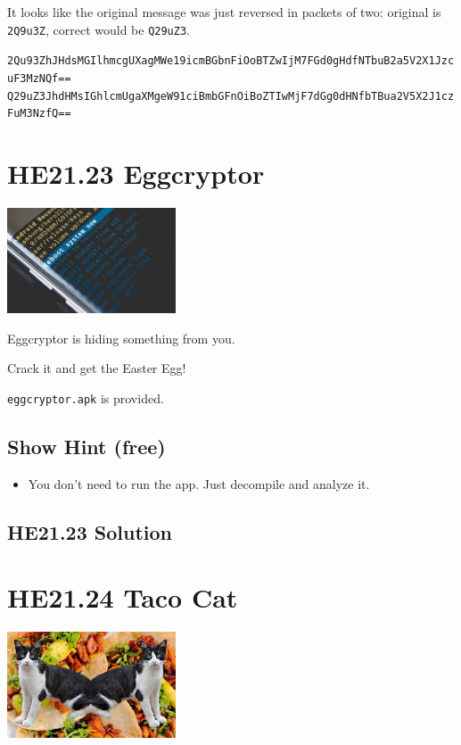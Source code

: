 \documentclass[english,a4paper,nols,noindent]{tufte-handout}
\begin{document}
It looks like the original message was just reversed in packets of two: original is \verb+2Q9u3Z+, correct would be \verb+Q29uZ3+.

\verb+2Qu93ZhJHdsMGIlhmcgUXagMWe19icmBGbnFiOoBTZwIjM7FGd0gHdfNTbuB2a5V2X1JzcuF3MzNQf==+
\verb+Q29uZ3JhdHMsIGhlcmUgaXMgeW91ciBmbGFnOiBoZTIwMjF7dGg0dHNfbTBua2V5X2J1czFuM3NzfQ==+

\hypertarget{he21.23}{%
  \section{HE21.23 Eggcryptor}
  \label{he21.23}}
\begin{marginfigure}
    \includegraphics[width=50mm]{images/challenge23.jpg}
\end{marginfigure}

\noindent Eggcryptor is hiding something from you.

Crack it and get the Easter Egg!

\verb+eggcryptor.apk+ is provided.
\subsection{Show Hint (free)}
\begin{itemize}
\item You don't need to run the app. Just decompile and analyze it.
\end{itemize}


\hypertarget{he21.23-solution}{%
\subsection{HE21.23 Solution}\label{he21.23-solution}}

\noindent 




\hypertarget{he21.24}{%
  \section{HE21.24 Taco Cat}
  \label{he21.24}}
\begin{marginfigure}
    \includegraphics[width=50mm]{images/challenge24.jpg}
\end{marginfigure}
\end{document}
